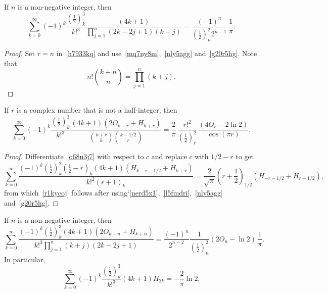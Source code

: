 \documentclass[12pt,reqno]{article}
\begin{document}
\begin{corollary}
If $n$ is a non-negative integer, then
\begin{equation*}
\sum_{k = 0}^\infty  {( - 1)^k \frac{{\left( {\frac{1}{2}} \right)_k^3 }}{{k!^3 }}\frac{{\left( {4k + 1} \right)}}{{\prod_{j = 1}^n {\left( {2k - 2j + 1} \right)\left( {k + j} \right)} }}}  = \frac{{( - 1)^n }}{{\left( {\frac{1}{2}} \right)_n^2 2^{n - 1} }}\,\frac{1}{\pi }.
\end{equation*}
\end{corollary}
\begin{proof}
Set $r=n$ in~\eqref{h7933kq} and use~\eqref{mq7ny8m},~\eqref{nly5agg} and~\eqref{g20r5hg}. Note that
\begin{equation}
n!\binom{{k + n}}{n} = \prod_{j = 1}^n {\left( {k + j} \right)} .
\end{equation}
\end{proof}
\begin{theorem}
If $r$ is a complex number that is not a half-integer, then
\begin{equation}\label{r1kycoj}
\sum_{k = 0}^\infty  {( - 1)^k \frac{{\left( {\frac{1}{2}} \right)_k^3 }}{{k!^3 }}\frac{{\left( {4k + 1} \right)\left( {2O_{k - r}  + H_{k + r} } \right)}}{{\binom{{k + r}}{k}\binom{{k - 1/2}}{r}}}}  = \frac{2}{\pi }\,\frac{{r!^2 }}{{\left( {\frac{1}{2}} \right)_r^2 }}\,\frac{{\left( {4O_r  - 2\ln 2} \right)}}{{\cos \left( \pi r \right)}}.
\end{equation}
\end{theorem}
\begin{proof}
Differentiate~\eqref{o68u3j7} with respect to $c$ and replace $c$ with $1/2-r$ to get
\begin{equation}\label{hr8o23s}
\sum_{k = 0}^\infty  {\frac{{( - 1)^k \left( {\frac{1}{2}} \right)_k^2 \left( {\frac{1}{2} - r} \right)_k \left( {4k + 1} \right)\left( {H_{k - r - 1/2}  + H_{k + r} } \right)}}{{k!^2 \left( {r + 1} \right)_k }}}  = \frac{2}{{\sqrt \pi  }}\left( {r + \frac{1}{2}} \right)_{1/2} \left( {H_{ - r - 1/2}  + H_{r - 1/2} } \right),
\end{equation}
from which~\eqref{r1kycoj} follows after using`\eqref{nerd5x1},~\eqref{l5fmdri},~\eqref{nly5agg} and~\eqref{g20r5hg}.
\end{proof}
\begin{corollary}
If $n$ is a non-negative integer, then
\begin{equation*}
\sum_{k = 0}^\infty  {\frac{{( - 1)^k \left( {\frac{1}{2}} \right)_k^3 \left( {4k + 1} \right)\left( {2O_{k - n}  + H_{k + n} } \right)}}{{k!^3 \prod_{j = 1}^n {\left( {k + j} \right)\left( {2k - 2j + 1} \right)} }}}  = \frac{{( - 1)^n }}{{2^{n - 2} }}\frac{1}{{\left( {\frac{1}{2}} \right)_n^2 }}\left( {2O_n  - \ln 2} \right)\,\frac{1}{\pi }.
\end{equation*}
In particular,
\begin{equation*}
\sum_{k = 0}^\infty  {( - 1)^k \frac{{\left( {\frac{1}{2}} \right)_k^3 }}{{k!^3 }}\left( {4k + 1} \right)H_{2k} }  =  - \frac{2}{\pi }\ln 2.
\end{equation*}
\end{corollary}
\end{document}
